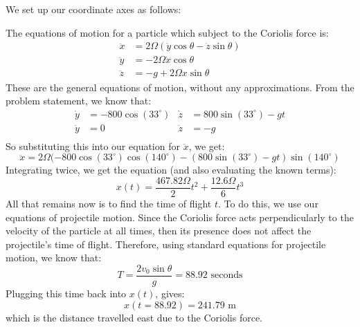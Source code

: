 \documentclass[10pt]{article}
\begin{document}
	\begin{solution}
		We set up our coordinate axes as follows:

		\begin{center}
	\end{center}	
		The equations of motion for a particle which subject to the Coriolis force is:
		\begin{align*}
			\ddot x &= 2\Omega(\dot y \cos \theta - \dot z \sin \theta) \\
			\ddot y &= -2\Omega \dot x \cos \theta \\
			\ddot z &= -g + 2\Omega x \sin \theta
		\end{align*}
		These are the general equations of motion, without any approximations. From the problem statement, we 
		know that:
		\begin{align*}
			\dot y &= -800 \cos (33^\circ) & \dot z &= 800\sin(33^\circ) - gt \\
			\ddot y &= 0 & \ddot z &= -g \\
		\end{align*}
		So substituting this into our equation for $\ddot x$, we get: 
		\[
		\ddot x = 2\Omega(-800 \cos(33^\circ) \cos (140^\circ) - (800 \sin(33^\circ) - gt)\sin(140^\circ)
		\] 
		Integrating twice, we get the equation (and also evaluating the known terms):
		\[
		x(t) = \frac{467.82\Omega}{2}t^2 + \frac{12.6 \Omega}{6}t^3
		\] 
		All that remains now is to find the time of flight $t$. To do this, we use our equations of projectile
		motion. Since the Coriolis force acts perpendicularly to the velocity of the particle at all times, then
		its presence does not affect the projectile's time of flight. Therefore, using standard equations for 
		projectile motion, we know that: 
		\[
		 T = \frac{2v_0\sin \theta}{g} = 88.92 \text{ seconds}
		\] 
		Plugging this time back into $x(t)$, gives:
		\[
		x(t =88.92) = 241.79 \text{ m}
		\] 
		which is the distance travelled east due to the Coriolis force. 
	\end{solution}
\end{document}
